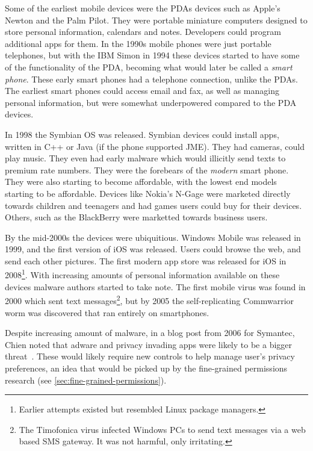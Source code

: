 \documentclass[thesis.tex]{subfiles}
\begin{document}
Some of the earliest mobile devices were the \acp{PDA} devices such as Apple's
Newton and the Palm Pilot. They were portable miniature computers designed to
store personal information, calendars and notes. Developers could program
additional apps for them. In the 1990s mobile phones were just portable
telephones, but with the IBM Simon in 1994 these devices started to have some of
the functionality of the \ac{PDA}, becoming what would later be called a
\emph{smart phone}. These early smart phones had a telephone connection, unlike
the \acp{PDA}. The earliest smart phones could access email and fax, as well as
managing personal information, but were somewhat underpowered compared to the
\ac{PDA} devices.

In 1998 the Symbian OS was released. Symbian devices could install apps, written
in C++ or Java (if the phone supported JME). They had cameras, could play music.
They even had early malware which would illicitly send texts to premium rate
numbers. They were the forebears of the \emph{modern} smart phone. They were
also starting to become affordable, with the lowest end models starting to be
affordable. Devices like Nokia's N-Gage were marketed directly towards children
and teenagers and had games users could buy for their devices. Others, such as
the BlackBerry were marketted towards business users.

By the mid-2000s the devices were ubiquitious. Windows Mobile was released in
1999, and the first version of iOS was released. Users could browse the web, and
send each other pictures. The first modern app store was released for iOS in
2008\footnote{Earlier attempts existed but resembled Linux package managers.}.
With increasing amounts of personal information available on these devices
malware authors started to take note. The first mobile virus was found in 2000
which sent text messages\footnote{The Timofonica virus infected Windows PCs to
send text messages via a web based SMS gateway. It was not harmful, only
irritating.}, but by 2005 the self-replicating Commwarrior worm was discovered
that ran entirely on smartphones.

Despite increasing amount of malware, in a blog post from 2006 for Symantec,
Chien noted that adware and privacy invading apps were likely to be a bigger
threat~\cite{eric_chien_spyware_2006}. These would likely require new controls to
help manage user's privacy preferences, an idea that would be picked up by the
fine-grained permissions research (see \autoref{sec:fine-grained-permissions}).
\end{document}
